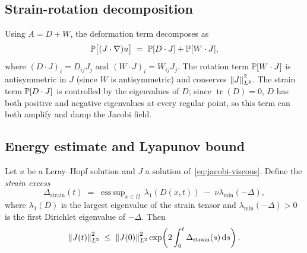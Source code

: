 \subsection{Strain-rotation decomposition}

Using $A = D + W$, the deformation term decomposes as
\[
  \mathbb{P}\bigl[(J\cdot\nabla)u\bigr]
  \;=\; \mathbb{P}[D \cdot J] + \mathbb{P}[W \cdot J],
\]
where $(D\cdot J)_i = D_{ij}J_j$ and $(W\cdot J)_i = W_{ij}J_j$.
The rotation term $\mathbb{P}[W\cdot J]$ is antisymmetric in $J$ (since $W$ is antisymmetric)
and conserves $\left\lVert J \right\rVert^2_{L^{2}}$.
The strain term $\mathbb{P}[D\cdot J]$ is controlled by the eigenvalues of $D$;
since $\operatorname{tr}(D) = 0$, $D$ has both positive and negative eigenvalues at
every regular point, so this term can both amplify and damp the Jacobi field.

\subsection{Energy estimate and Lyapunov bound}

\begin{proposition}\label{prop:jacobi-lyapunov}
  Let $u$ be a Leray--Hopf solution and $J$ a solution of~\eqref{eq:jacobi-viscous}.
  Define the \emph{strain excess}
  \begin{equation}\label{eq:strain-excess}
    \Delta_{\mathrm{strain}}(t)
    \;=\;
    \operatorname{ess\,sup}_{x \in \Omega}\, \lambda_1(D(x,t))
    \;-\; \nu\lambda_{\min}(-\Delta),
  \end{equation}
  where $\lambda_1(D)$ is the largest eigenvalue of the strain tensor and
  $\lambda_{\min}(-\Delta) > 0$ is the first Dirichlet eigenvalue of $-\Delta$.
  Then
  \begin{equation}\label{eq:jacobi-lyapunov}
    \left\lVert J(t) \right\rVert^2_{L^{2}}
    \;\leq\;
    \left\lVert J(0) \right\rVert^2_{L^{2}}
    \exp\!\left(2\int_0^t \Delta_{\mathrm{strain}}(s)\,\mathrm{d} s\right).
  \end{equation}
\end{proposition}

